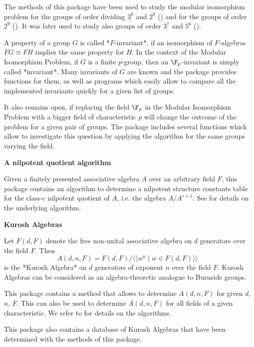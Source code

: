 The methods of this package have been used to study the modular isomorphism
problem for the groups of order dividing $3^6$ and $2^8$ (\cite{Eic07}) and
for the groups of order $2^9$ (\cite{EKo11}). It was later used to study also 
groups of order $3^7$ and $5^6$ (\cite{MM22}).
\medskip

A property of a group $G$ is called *$F$-invariant*, if an isomorphism of
$F$-algebras $FG \cong FH$ implies the same property for $H$. In the context
of the Modular Isomorphism Problem, if $G$ is a finite $p$-group, then an 
$\F_p$-invariant is simply called 
*invariant*. Many invariants of $G$ are known and the package provides
functions for them, as well as programs which easily allow to compare all
the implemented invariants quickly for a given list of groups.
\medskip

It also remains open, if replacing the field $\F_p$ in the Modular Isomorphism
Problem with a bigger field of characteristic $p$ will change the outcome
of the problem for a given pair of groups. The package includes several 
functions which allow to investigate this question by applying the algorithm
for the same groups varying the field.
\medskip

{\bf A nilpotent quotient algorithm}

Given a finitely presented associative algebra $A$ over an arbitrary
field $F$, this package contains an algorithm to determine a nilpotent
structure constants table for the class-$c$ nilpotent quotient of $A$,
i.e. the algebra $A/A^{c+1}$. 
See \cite{Eic11} for details on the underlying algorithm.
\medskip

{\bf Kurosh Algebras}

Let $F(d,F)$ denote the free non-unital associative algebra on $d$ 
generators over the field $F$. Then 
$$A(d,n,F) = F(d,F) / \langle \langle w^n \mid w \in F(d,F) \rangle \rangle$$
is the *Kurosh Algebra* on $d$ generators of exponent $n$ over the field
$F$. Kurosh Algebras can be considered as an algebra-theoretic analogue to 
Burnside groups. 

This package contains a method that allows to determine $A(d,n,F)$ for
given $d$, $n$, $F$. This can also be used to determine $A(d,n,F)$ for all
fields of a given characteristic. We refer to \cite{Eic11} for details on
the algorithms.

This package also contains a database of Kurosh Algebras that have been
determined with the methods of this package. 

